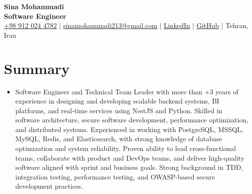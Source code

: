 \documentclass[letterpaper,11pt]{article}
\newcommand{\resumeItem}[1]{
  \item\small{
    {#1 \vspace{-2pt}}
  }
}
\newcommand{\resumeSubHeadingListStart}{\begin{itemize}[leftmargin=0.15in, label={}]}
\newcommand{\resumeSubHeadingListEnd}{\end{itemize}}
\begin{document}

\begin{center}
    \textbf{\Huge \bfseries Sina Mohammadi} \\ \vspace{4pt}
    \textbf{\large \bfseries Software Engineer} \\ \vspace{5pt}
    \small
    \faMobile \hspace{.5pt} \href{tel:9120244782}{+98 912 024 4782}
    $|$
    \faAt \hspace{.5pt} \href{mailto:sinamohammadi213@gmail.com}{sinamohammadi213@gmail.com}
    $|$
    \faLinkedinSquare \hspace{.5pt} \href{https://www.linkedin.com/in/s-mohammadi-/}{LinkedIn}
    $|$
    \faGithub \hspace{.5pt} \href{https://github.com/ksinaa}{GitHub}
    $|$
    \faMapMarker \hspace{.5pt} {Tehran, Iran}
\end{center}




\section{Summary}
  \vspace{3pt}
  \resumeSubHeadingListStart
    \resumeItem{
      Software Engineer and Technical Team Leader with more than +3 years of experience in designing and developing scalable backend systems, BI platforms, and real-time services using NestJS and Python. Skilled in software architecture, secure software development, performance optimization, and distributed systems. Experienced in working with PostgreSQL, MSSQL, MySQL, Redis, and Elasticsearch, with strong knowledge of database optimization and system reliability. Proven ability to lead cross-functional teams, collaborate with product and DevOps teams, and deliver high-quality software aligned with sprint and business goals. Strong background in TDD, integration testing, performance testing, and OWASP-based secure development practices.
    }
  \resumeSubHeadingListEnd
\end{document}
